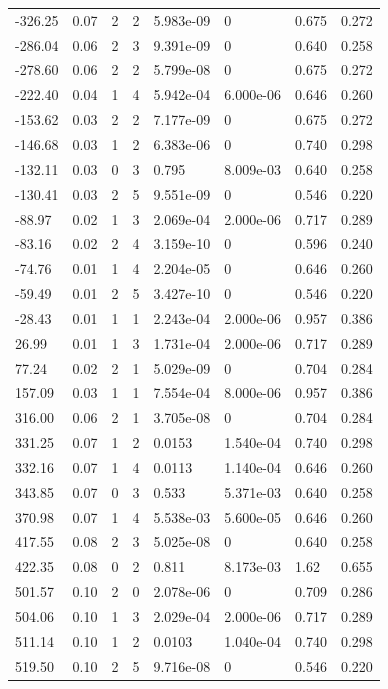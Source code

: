 \documentclass[preview]{standalone}
\begin{document}
{{\begin{tabular}{L{1.2cm}C{1.2cm} C{0.3cm}C{0.5cm} C{1.4cm}C{1.4cm} C{1.4cm}C{1.4cm}}
  -326.25  &  0.07  & 2     &  2 &  5.983e-09  & 0  & 0.675 &  0.272   \\ 
  -286.04  &  0.06  & 2     &  3 &  9.391e-09  & 0  & 0.640 &  0.258   \\ 
  -278.60  &  0.06  & 2     &  2 &  5.799e-08  & 0  & 0.675 &  0.272   \\ 
  -222.40  &  0.04  & 1     &  4 &  5.942e-04  & 6.000e-06  & 0.646 &  0.260   \\ 
  -153.62  &  0.03  & 2     &  2 &  7.177e-09  & 0  & 0.675 &  0.272   \\ 
  -146.68  &  0.03  & 1     &  2 &  6.383e-06  & 0  & 0.740 &  0.298   \\ 
  -132.11  &  0.03  & 0     &  3 &  0.795  & 8.009e-03  & 0.640 &  0.258   \\ 
  -130.41  &  0.03  & 2     &  5 &  9.551e-09  & 0  & 0.546 &  0.220   \\ 
  -88.97  &  0.02  & 1     &  3 &  2.069e-04  & 2.000e-06  & 0.717 &  0.289   \\ 
  -83.16  &  0.02  & 2     &  4 &  3.159e-10  & 0  & 0.596 &  0.240   \\ 
  -74.76  &  0.01  & 1     &  4 &  2.204e-05  & 0  & 0.646 &  0.260   \\ 
  -59.49  &  0.01  & 2     &  5 &  3.427e-10  & 0  & 0.546 &  0.220   \\ 
  -28.43  &  0.01  & 1     &  1 &  2.243e-04  & 2.000e-06  & 0.957 &  0.386   \\ 
  26.99  &  0.01  & 1     &  3 &  1.731e-04  & 2.000e-06  & 0.717 &  0.289   \\ 
  77.24  &  0.02  & 2     &  1 &  5.029e-09  & 0  & 0.704 &  0.284   \\ 
  157.09  &  0.03  & 1     &  1 &  7.554e-04  & 8.000e-06  & 0.957 &  0.386   \\ 
  316.00  &  0.06  & 2     &  1 &  3.705e-08  & 0  & 0.704 &  0.284   \\ 
  331.25  &  0.07  & 1     &  2 &  0.0153  & 1.540e-04  & 0.740 &  0.298   \\ 
  332.16  &  0.07  & 1     &  4 &  0.0113  & 1.140e-04  & 0.646 &  0.260   \\ 
  343.85  &  0.07  & 0     &  3 &  0.533  & 5.371e-03  & 0.640 &  0.258   \\ 
  370.98  &  0.07  & 1     &  4 &  5.538e-03  & 5.600e-05  & 0.646 &  0.260   \\ 
  417.55  &  0.08  & 2     &  3 &  5.025e-08  & 0  & 0.640 &  0.258   \\ 
  422.35  &  0.08  & 0     &  2 &  0.811  & 8.173e-03  & 1.62 &  0.655   \\ 
  501.57  &  0.10  & 2     &  0 &  2.078e-06  & 0  & 0.709 &  0.286   \\ 
  504.06  &  0.10  & 1     &  3 &  2.029e-04  & 2.000e-06  & 0.717 &  0.289   \\ 
  511.14  &  0.10  & 1     &  2 &  0.0103  & 1.040e-04  & 0.740 &  0.298   \\ 
  519.50  &  0.10  & 2     &  5 &  9.716e-08  & 0  & 0.546 &  0.220   \\ 
\hline 
\end{tabular} 

}}
\end{document}
